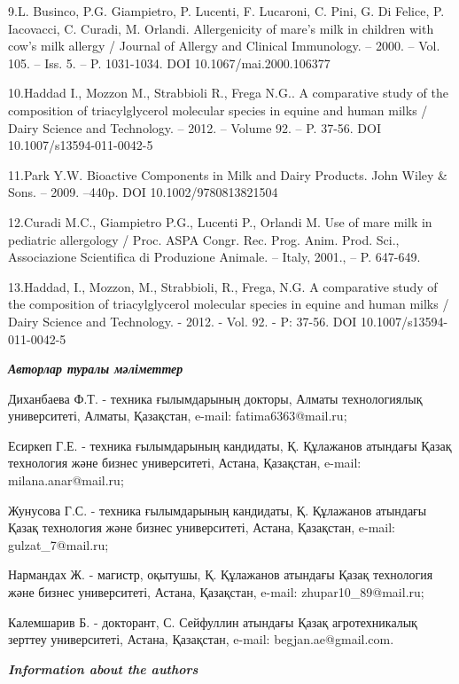 \begin{noparindent}
9.L. Businco, P.G. Giampietro, P. Lucenti, F. Lucaroni, C. Pini, G. Di
  Felice, P. Iacovacci, C. Curadi, M. Orlandi. Allergenicity of mare's
  milk in children with cow's milk allergy / Journal of Allergy and
  Clinical Immunology. -- 2000. -- Vol. 105. -- Iss. 5. -- P. 1031-1034.
  DOI 10.1067/mai.2000.106377

10.Haddad I., Mozzon M., Strabbioli R., Frega N.G.. A comparative study
  of the composition of triacylglycerol molecular species in equine and
  human milks / Dairy Science and Technology. -- 2012. -- Volume 92. --
  P. 37-56. DOI 10.1007/s13594-011-0042-5

11.Park Y.W. Bioactive Components in Milk and Dairy Products. John Wiley
  \& Sons. -- 2009. --440p. DOI 10.1002/9780813821504

12.Curadi M.C., Giampietro P.G., Lucenti P., Orlandi M. Use of mare milk
  in pediatric allergology / Proc. ASPA Congr. Rec. Prog. Anim. Prod.
  Sci., Associazione Scientifica di Produzione Animale. -- Italy, 2001.,
  -- P. 647-649.

13.Haddad, I., Mozzon, M., Strabbioli, R., Frega, N.G. A comparative
  study of the composition of triacylglycerol molecular species in
  equine and human milks / Dairy Science and Technology. - 2012. - Vol.
  92. - P: 37-56. DOI 10.1007/s13594-011-0042-5
\end{noparindent}

\emph{{\bfseries Авторлар туралы мәліметтер}}

\begin{noparindent}{2}
Диханбаева Ф.Т. - техника ғылымдарының докторы, Алматы технологиялық
университеті, Алматы, Қазақстан, e-mail: fatima6363@mail.ru;

Есиркеп Г.Е. - техника ғылымдарының кандидаты, Қ. Құлажанов атындағы
Қазақ технология және бизнес университеті, Астана, Қазақстан, e-mail:
milana.anar@mail.ru;

Жунусова Г.С. - техника ғылымдарының кандидаты, Қ. Құлажанов атындағы
Қазақ технология және бизнес университеті, Астана, Қазақстан, e-mail:
gulzat\_7@mail.ru;

Нармандах Ж. - магистр, оқытушы, Қ. Құлажанов атындағы Қазақ технология
және бизнес университеті, Астана, Қазақстан, e-mail:
zhupar10\_89@mail.ru;

Калемшарив Б. - докторант, С. Сейфуллин атындағы Қазақ агротехникалық
зерттеу университеті, Астана, Қазақстан, e-mail: begjan.ae@gmail.com.
\end{noparindent}

\emph{{\bfseries Information about the authors}}

